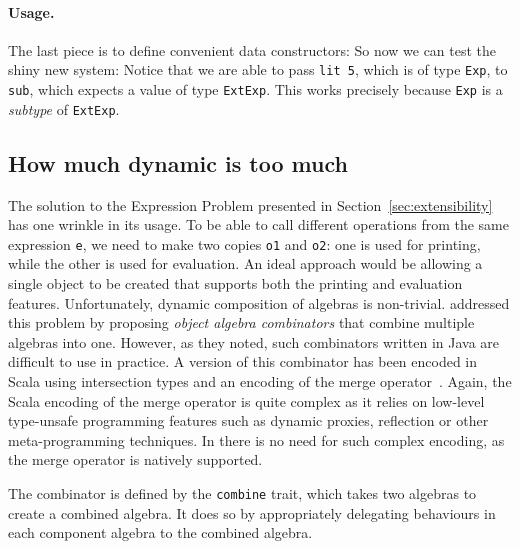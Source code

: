 \paragraph{Usage.} The last piece is to define convenient data constructors:
So now we can test the shiny new system:
Notice that we are able to pass \lstinline{lit 5}, which is of type
\lstinline{Exp}, to \lstinline{sub}, which expects a value of type
\lstinline{ExtExp}. This works precisely because \lstinline{Exp} is a
\textit{subtype} of \lstinline{ExtExp}.



\subsection{How much dynamic is too much}
\label{sec:dynamic}

The solution to the Expression Problem presented in
Section~\ref{sec:extensibility} has one wrinkle in its usage. To be able to call
different operations from the same expression \lstinline{e}, we need to make two
copies \lstinline{o1} and \lstinline{o2}: one is used for printing, while the
other is used for evaluation. An ideal approach would be allowing a single object
to be created that supports both the printing and evaluation features.
Unfortunately, dynamic composition of algebras is non-trivial.
\citet{oliveira2012extensibility} addressed this problem by proposing
\textit{object algebra combinators} that combine multiple algebras into one.
However, as they noted, such combinators written in Java are difficult to use in
practice. A version of this combinator has been encoded in Scala using
intersection types and an encoding of the merge
operator~\cite{oliveira2013feature, rendel14attributes}. Again, the Scala
encoding of the merge operator is quite complex as it relies on low-level
type-unsafe programming features such as dynamic proxies, reflection or other
meta-programming techniques. In \name there is no need for such complex
encoding, as the merge operator is natively supported.

The combinator is defined by the \lstinline{combine} trait, which takes two
algebras to create a combined algebra. It does so by appropriately delegating
behaviours in each component algebra to the combined algebra.


